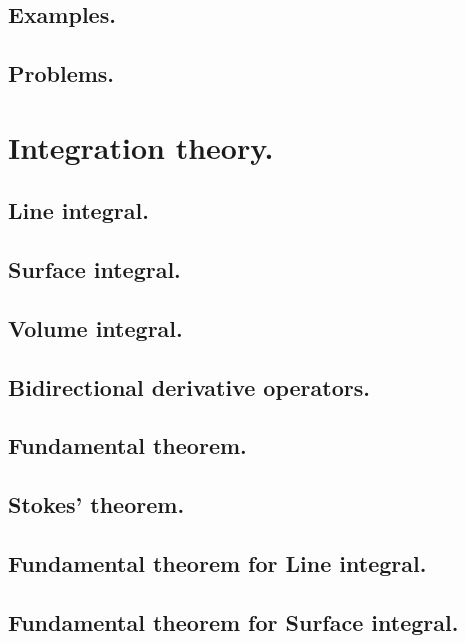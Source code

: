       \subsection{Examples.}
         
      \subsection{Problems.}
         
         
         
         
   \section{Integration theory.}
      \subsection{Line integral.}
         
      \subsection{Surface integral.}
         
      \subsection{Volume integral.}
         
      \subsection{Bidirectional derivative operators.}
         
      \subsection{Fundamental theorem.}
         
      \subsection{Stokes' theorem.}
         
      \subsection{Fundamental theorem for Line integral.}
         
      \subsection{Fundamental theorem for Surface integral.}
         
